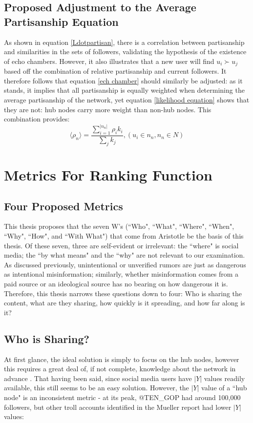 \documentclass[preprint,review,12pt]{elsarticle}
\begin{document}
\subsection{Proposed Adjustment to the Average Partisanship Equation}
As shown in equation \ref{Ldotpartisan}, there is a correlation between partisanship and similarities in the sets of followers, validating the hypothesis of the existence of echo chambers. However, it also illustrates that a new user will find $u_i \succ u_j$ based off the combination of relative partisanship and current followers. It therefore follows that equation \ref{ech chamber} should similarly be adjusted: as it stands, it implies that all partisanship is equally weighted when determining the average partisanship of the network, yet equation \ref{likelihood equation} shows that they are not: hub nodes carry more weight than non-hub nodes. This combination provides:
\begin{equation}
    \label{echo chamber by followers}
        \langle \rho_n \rangle = \frac{\sum_{i=1}^{|n_n|}\rho_ik_i}{\sum_{j}k_j}, (u_i \in n_n, n_n \in N)
 \end{equation}


\section{Metrics For Ranking Function}
\subsection{Four Proposed Metrics}
This thesis proposes that the seven W's (``Who", ``What", ``Where", ``When", ``Why", ``How", and ``With What") that come from Aristotle \cite{sloan2010aristotle,aquinas1952thomas} be the basis of this thesis. Of these seven, three are self-evident or irrelevant: the ``where" is social media; the ``by what means" and the ``why" are not relevant to our examination. As discussed previously, unintentional or unverified rumors are just as dangerous as intentional misinformation; similarly, whether misinformation comes from a paid source or an ideological source has no bearing on how dangerous it is. Therefore, this thesis narrows these questions down to four: Who is sharing the content, what are they sharing, how quickly is it spreading, and how far along is it?

\subsection{Who is Sharing?}
At first glance, the ideal solution is simply to focus on the hub nodes, however this requires a great deal of, if not complete, knowledge about the network in advance  \cite{dezsHo2002halting,pastor2002immunization}. That having been said, since social media users have $|Y|$ values readily available, this still seems to be an easy solution. However, the $|Y|$ value of a ``hub node" is an inconsistent metric - at its peak, @TEN\_GOP had around 100,000 followers, but other troll accounts identified in the Mueller report had lower $|Y|$ values:
\end{document}
